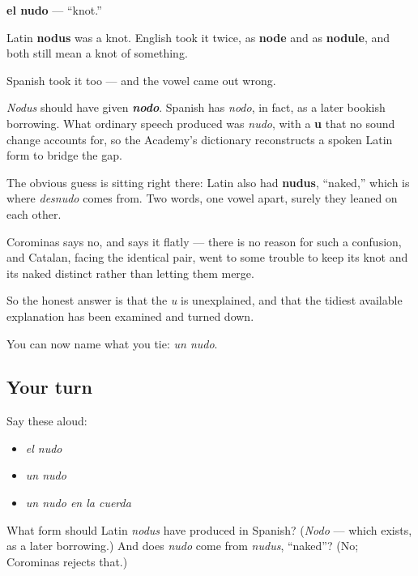 \begin{cousinweb}
\textbf{el nudo} — \textquotedblleft{}knot.\textquotedblright{}

Latin \textbf{nodus} was a knot. English took it twice, as \textbf{node} and as \textbf{nodule}, and both still mean a knot of something.

Spanish took it too — and the vowel came out wrong.

\emph{Nodus} should have given \emph{\textbf{nodo}}. Spanish has \emph{nodo}, in fact, as a later bookish borrowing. What ordinary speech produced was \emph{nudo}, with a \textbf{u} that no sound change accounts for, so the Academy's dictionary reconstructs a spoken Latin form to bridge the gap.

The obvious guess is sitting right there: Latin also had \textbf{nudus}, \textquotedblleft{}naked,\textquotedblright{} which is where \emph{desnudo} comes from. Two words, one vowel apart, surely they leaned on each other.

Corominas says no, and says it flatly — there is no reason for such a confusion, and Catalan, facing the identical pair, went to some trouble to keep its knot and its naked distinct rather than letting them merge.

So the honest answer is that the \emph{u} is unexplained, and that the tidiest available explanation has been examined and turned down.
\end{cousinweb}

\begin{grammarlens}[title={What you've built}]
You can now name what you tie: \emph{un nudo}.
\end{grammarlens}

\subsection*{Your turn}
Say these aloud:

\begin{itemize}
\raggedright
  \item \emph{el nudo}
  \item \emph{un nudo}
  \item \emph{un nudo en la cuerda}
\end{itemize}

\begin{tcolorbox}[breakable,colback=teal!4,colframe=teal!35!black,title={Before you move on}]
What form should Latin \emph{nodus} have produced in Spanish? (\emph{Nodo} — which exists, as a later borrowing.) And does \emph{nudo} come from \emph{nudus}, \textquotedblleft{}naked\textquotedblright{}? (No; Corominas rejects that.)
\end{tcolorbox}
